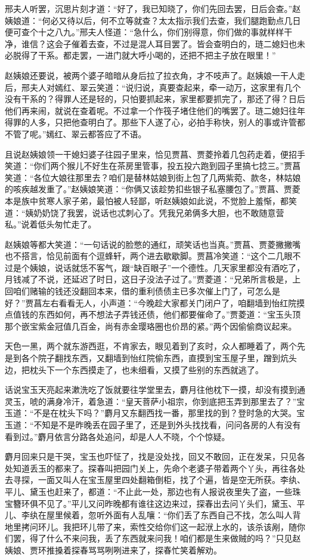 \documentclass[12pt,oneside]{book}
\begin{document}
邢夫人听罢，沉思片刻才道：“好了，我已知晓了，你们先回去罢，日后会查。”赵姨娘道：“何必又待以后，何不立等就查？太太指示我们去查，我们腿跑勤点几日便可查个十之八九。”邢夫人怪道：“急什么，你们别得意，你们做的事就样样干净，谁信？这会子催着去查，不过是混人耳目罢了。皆会查明白的，琏二媳妇也未必脱得了干系。都走罢，一进门就大呼小喝的，还把不把主子放在眼里！”

赵姨娘还要说，被两个婆子暗暗从身后拉了拉衣角，才不吱声了。赵姨娘一干人走后，邢夫人对嫣红、翠云笑道：“说归说，真要查起来，牵一动万，这家里有几个没有干系的？得罪人还是轻的，只怕要抓起来，家里都要抓完了，那还了得？日后他们再来闹，就说在查着呢。不过拿一个作筏子堵住他们的嘴罢了。琏二媳妇往年得罪的人多，只把他查明白了。那些下人遂了心，必拍手称快，别人的事或许管都不管了呢。”嫣红、翠云都答应了不语。

且说赵姨娘领一干媳妇婆子往园子里来，恰见贾菖、贾菱拎着几包药走着，便招手笑道：“你们两个猴儿不好生在茶房里管事，投五投六跑到园子里搞七捻三。”贾菖笑道：“各位大娘往那里去？咱们是替林姑娘到街上包了几两紫菀、款冬，林姑娘的咳疾越发重了。”赵姨娘笑道：“你俩又该趁势扣些银子私塞腰包了。”贾菖、贾菱本是族中贫寒人家子弟，最怕被人轻鄙，听赵姨娘如此说，不觉脸上羞惭，都笑道：“姨奶奶饶了我罢，说话也忒刺心了。凭我兄弟俩多大胆，也不敢随意营私。”说着低头匆忙走了。

赵姨娘等都大笑道：“一句话说的脸憋的通红，顽笑话也当真。”贾菖、贾菱撇撇嘴也不搭言，恰见前面有个逗蜂轩，两个进去歇歇脚。贾菖冷笑道：“这个二几眼不过是个姨娘，说话就恁不客气，跟“缺百眼子”一个德性。几天家里都没有酒吃了，月钱减了不说，还延迟了时日，这日子没法子过了。”贾菱道：“兄弟所言极是，上回咱们赌输的钱还没翻回本来，借的重利债债主已多次催上门了，可怎么是好？”贾菖左右看看无人，小声道：“今晚趁大家都关门闭户了，咱翻墙到怡红院摸点值钱的东西如何，再不想法子弄钱还债，他们都要催命了。”贾菱道：“宝玉头顶那个嵌宝紫金冠值几百金，尚有赤金璎珞圈也价昂的紧。”两个因偷偷商议起来。

天色一黑，两个就东游西逛，不肯家去，眼见着到了亥时，众人都睡着了，两个先是到各个院子翻找东西，又翻墙到怡红院偷东西，直摸到宝玉屋子里，蹭到炕头边，把枕头下一个东西摸走了，也未细看，又摸了些别的东西就逃了。

话说宝玉天亮起来漱洗吃了饭就要往学堂里去，麝月往他枕下一摸，却没有摸到通灵玉，唬的满身冷汗，着急道：“皇天菩萨小祖宗，你到底把玉弄到那里去了？”宝玉道：“不是在枕头下吗？”麝月又东翻西找一番，那里找的到？登时急的大哭。宝玉道：“不知是不是昨晚丢在园子里了，还是到外头找找看，问问各房的人有没有看到过。”麝月依言分路各处追问，却是人人不晓，个个惊疑。

麝月回来只是干哭，宝玉也吓怔了，找是没处找，回又不敢回，正在发呆，只见各处知道丢玉的都来了。探春叫把园门关上，先命个老婆子带着两个丫头，再往各处去寻探，一面又叫人在宝玉屋里四处翻箱倒柜，找了个遍，皆是空无所获。李纨、平儿、黛玉也赶来了，都道：“不止此一处，那边也有人报说夜里失了盗，一些珠宝簪环俱不见了。”平儿又问昨晚都有谁往这边来过，探春出去问丫头们，黛玉、平儿、李纨在屋里候着，忽听外面有人乱嚷：“你们丢了东西自己不找，怎么叫人背地里拷问环儿。我把环儿带了来，索性交给你们这一起洑上水的，该杀该剐，随你们罢，得了什么不来问我，丢了东西就来问我！咱们都是生来做贼的吗？”只见赵姨娘、贾环推搡着探春骂骂咧咧进来了，探春忙笑着解劝。
\end{document}
